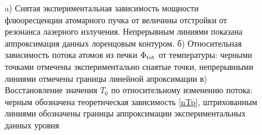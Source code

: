 \begin{figure}[ht]
    \centering
    \hspace{5 mm} 
    \vspace{-3mm}
    \caption{a) Снятая экспериментальная зависимость мощности флюоресценции атомарного пучка от величины отстройки от резонанса лазерного излучения. Непрерывным линиями показана аппроксимация данных лоренцовым контуром. б) Относительная зависимость потока атомов из печки $\Phi_{\textnormal{tot}}$ от температуры: черными точками отмечены экспериментально снаятые точки, непрерывными линиями отмечены границы линейной апроксимации  в) Восстановление значения $T_0$ по относительному изменению потока: черным обозначена теоретическая зависимость \eqref{nTp}, штрихованным линиями обозначены границы аппроксимации экспериментальных данных уровня}
    \label{fig:oven}
\end{figure}


